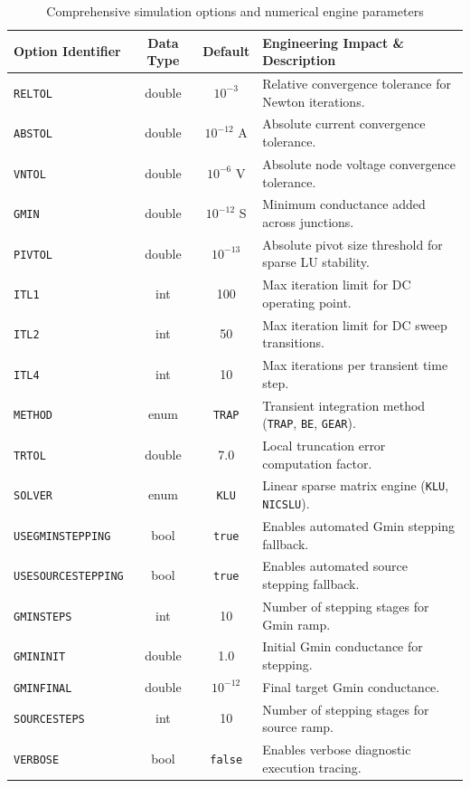 \begin{table}[H]
\centering
\small
\begin{tabular}{|l|c|c|p{5.5cm}|}
\hline
\textbf{Option Identifier} & \textbf{Data Type} & \textbf{Default} & \textbf{Engineering Impact \& Description} \\
\hline
\texttt{RELTOL} & double & $10^{-3}$ & Relative convergence tolerance for Newton iterations. \\
\hline
\texttt{ABSTOL} & double & $10^{-12}$ A & Absolute current convergence tolerance. \\
\hline
\texttt{VNTOL} & double & $10^{-6}$ V & Absolute node voltage convergence tolerance. \\
\hline
\texttt{GMIN} & double & $10^{-12}$ S & Minimum conductance added across junctions. \\
\hline
\texttt{PIVTOL} & double & $10^{-13}$ & Absolute pivot size threshold for sparse LU stability. \\
\hline
\texttt{ITL1} & int & 100 & Max iteration limit for DC operating point. \\
\hline
\texttt{ITL2} & int & 50 & Max iteration limit for DC sweep transitions. \\
\hline
\texttt{ITL4} & int & 10 & Max iterations per transient time step. \\
\hline
\texttt{METHOD} & enum & \texttt{TRAP} & Transient integration method (\texttt{TRAP}, \texttt{BE}, \texttt{GEAR}). \\
\hline
\texttt{TRTOL} & double & 7.0 & Local truncation error computation factor. \\
\hline
\texttt{SOLVER} & enum & \texttt{KLU} & Linear sparse matrix engine (\texttt{KLU}, \texttt{NICSLU}). \\
\hline
\texttt{USEGMINSTEPPING}& bool & \texttt{true} & Enables automated Gmin stepping fallback. \\
\hline
\texttt{USESOURCESTEPPING}& bool & \texttt{true} & Enables automated source stepping fallback. \\
\hline
\texttt{GMINSTEPS} & int & 10 & Number of stepping stages for Gmin ramp. \\
\hline
\texttt{GMININIT} & double & 1.0 & Initial Gmin conductance for stepping. \\
\hline
\texttt{GMINFINAL} & double & $10^{-12}$ & Final target Gmin conductance. \\
\hline
\texttt{SOURCESTEPS} & int & 10 & Number of stepping stages for source ramp. \\
\hline
\texttt{VERBOSE} & bool & \texttt{false} & Enables verbose diagnostic execution tracing. \\
\hline
\end{tabular}
\caption{Comprehensive simulation options and numerical engine parameters}
\label{tab:simulation_options_complete}
\end{table}

